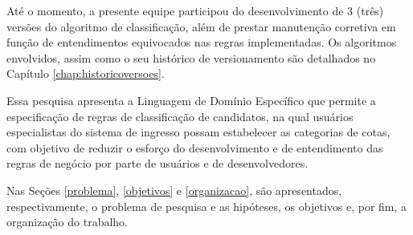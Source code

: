 Até o momento, a presente equipe participou do desenvolvimento de 3 (três) versões do algoritmo de classificação, além de prestar manutenção corretiva em função de entendimentos equivocados nas regras implementadas.  Os algoritmos envolvidos, assim como o seu histórico de versionamento são detalhados no Capítulo \ref{chap:historicoversoes}.

Essa pesquisa apresenta a Linguagem de Domínio Específico que permite a especificação de regras de classificação de candidatos, na qual usuários especialistas do sistema de ingresso possam estabelecer as categorias de cotas, com objetivo de reduzir o esforço do desenvolvimento e de entendimento das regras de negócio por parte de usuários e de desenvolvedores. 

Nas Seções \ref{problema}, \ref{objetivos} e \ref{organizacao}, são apresentados, respectivamente, o problema de pesquisa e as hipóteses, os objetivos e, por fim, a organização do trabalho.
